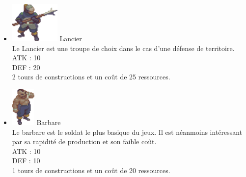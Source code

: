 \begin{itemize}
    \item \includegraphics[scale=0.31]{troops/spear.png}  Lancier\\
             Le Lancier est une troupe de choix dans le cas d'une défense de territoire.\\
    ATK : 10\\
    DEF : 20\\
    2 tours de constructions et un coût de 25 ressources.\\
    \item \includegraphics[scale=0.31]{troops/barbare.png}  Barbare\\
                 Le barbare est le soldat le plus basique du jeux. Il est néanmoins intéressant par sa rapidité de production et son faible coût.\\
    ATK : 10\\
    DEF : 10\\
    1 tours de constructions et un coût de 20 ressources.\\
  \end{itemize}


